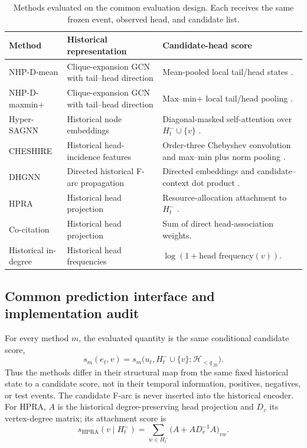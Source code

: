 \documentclass{svproc}
\newcommand{\Hcal}{\mathcal{H}}
\begin{document}
\begin{table}[t]
\caption{Methods evaluated on the common evaluation design. Each receives the same frozen event, observed head, and candidate list.}
\label{tab:methods}
\centering
\footnotesize
\setlength{\tabcolsep}{2.2pt}
\renewcommand{\arraystretch}{.94}
\begin{tabular}{@{}L{.20\textwidth}L{.32\textwidth}L{.42\textwidth}@{}}
\toprule
Method & Historical representation & Candidate-head score\\
\midrule
NHP-D-mean & Clique-expansion GCN with tail--head direction & Mean-pooled local tail/head states \cite{yadati2020nhp}.\\
NHP-D-maxmin+ & Clique-expansion GCN with tail--head direction & Max--min+ local tail/head pooling \cite{yadati2020nhp}.\\
Hyper-SAGNN & Historical node embeddings & Diagonal-masked self-attention over $H_t^-\cup\{v\}$ \cite{zhang2020hypersagnn}.\\
CHESHIRE & Historical head-incidence features & Order-three Chebyshev convolution and max--min plus norm pooling \cite{chen2023cheshire}.\\
DHGNN & Directed historical F-arc propagation & Directed embeddings and candidate--context dot product \cite{ma2024dhgnn}.\\
HPRA & Historical head projection & Resource-allocation attachment to $H_t^-$ \cite{kumar2020hpra}.\\
Co-citation & Historical head projection & Sum of direct head-association weights.\\
Historical in-degree & Historical head frequencies & $\log(1+\text{head frequency}(v))$.\\
\bottomrule
\end{tabular}
\end{table}

\subsection{Common prediction interface and implementation audit}

For every method $m$, the evaluated quantity is the same conditional candidate score,
\begin{equation}
s_m(e_t,v)=s_m\bigl(u_t,H_t^-\cup\{v\};\Hcal_{<q_{.20}}\bigr).
\label{eq:common-score}
\end{equation}
Thus the methods differ in their structural map from the same fixed historical state to a candidate score, not in their temporal information, positives, negatives, or test events. The candidate F-arc is never inserted into the historical encoder. For HPRA, $A$ is the historical degree-preserving head projection and $D_v$ its vertex-degree matrix; its attachment score is
\begin{equation}
s_{\mathrm{HPRA}}(v\mid H_t^-)=\sum_{w\in H_t^-}\bigl(A+AD_v^{-1}A\bigr)_{vw}.
\label{eq:hpra}
\end{equation}
\end{document}
